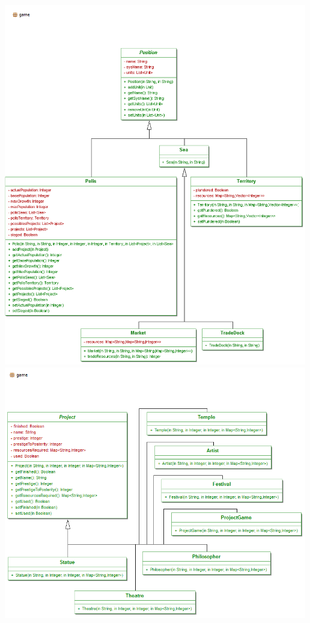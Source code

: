 \documentclass[11 pt]{book}
\begin{document}
\begin{center}
		    \includegraphics[width=500px]{design-uml/iteration3/game-positions.png}
		    \includegraphics[width=500px]{design-uml/iteration3/game-projects.png}

\end{center}
\end{document}

